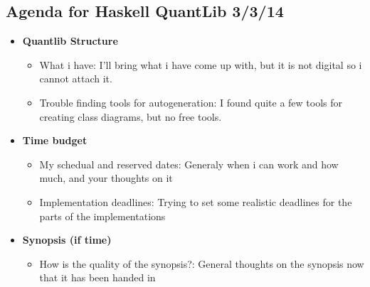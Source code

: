\documentclass{article}
\begin{document}
\begin{center}
\section*{Agenda for Haskell QuantLib 3/3/14}
\end{center}
\begin{itemize}
\item{\textbf{Quantlib Structure}}
    \begin{itemize}
        \item{What i have:} I'll bring what i have come up with, but it is not digital so i cannot attach it.
        \item{Trouble finding tools for autogeneration:} I found quite a few tools for creating class diagrams, but no free tools. 
    \end{itemize}
\item{\textbf{Time budget}} 
    \begin{itemize}
        \item{My schedual and reserved dates:} Generaly when i can work and how much, and your thoughts on it
        \item{Implementation deadlines:} Trying to set some realistic deadlines for the parts of the implementations 
    \end{itemize}
\item{\textbf{Synopsis (if time)}}
    \begin{itemize}
        \item{How is the quality of the synopsis?:} General thoughts on the synopsis now that it has been handed in
    \end{itemize}
\end{itemize}
\end{document}
